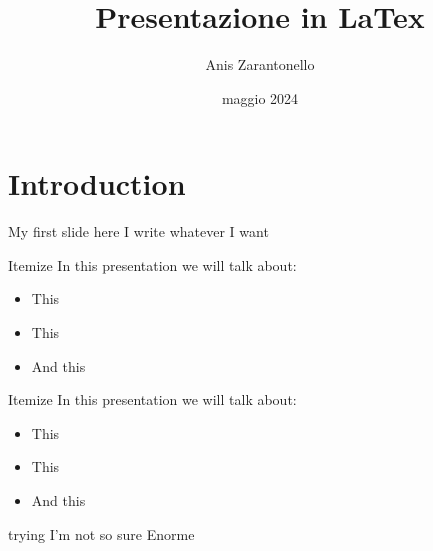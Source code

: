\documentclass{beamer} %
\title{Presentazione in LaTex}
\author{Anis Zarantonello}
\date{maggio 2024}
\begin{document}
\maketitle %


\section{Introduction}

\begin{frame}{My first slide} %
here I write whatever I want %
\end{frame}

\begin{frame}{Itemize}
In this presentation we will talk about: 
    \begin{itemize}
        \item This
        \item This
        \item And this 
\end{itemize}
\end{frame}

\begin{frame}{Itemize}
In this presentation we will talk about: 
    \begin{itemize}
        \item This
        \pause \item  This
        \pause \item  And this
\end{itemize}
\end{frame}



\begin{frame}{trying}
I'm not so sure  \Huge{Enorme}
\end{frame}
\end{document}
